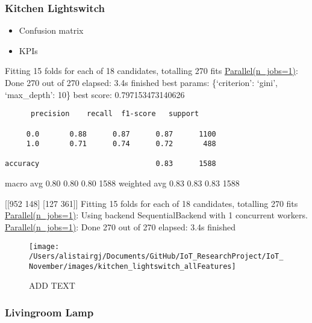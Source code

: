 \documentclass[11pt,]{article}
\providecommand{\tightlist}{%
  \setlength{\itemsep}{0pt}\setlength{\parskip}{0pt}}
\begin{document}
\pagebreak

\hypertarget{kitchen-lightswitch}{%
\subsubsection{Kitchen Lightswitch}\label{kitchen-lightswitch}}

\begin{itemize}
\tightlist
\item
  Confusion matrix
\item
  KPIs
\end{itemize}

Fitting 15 folds for each of 18 candidates, totalling 270 fits
\href{Done\%20270\%20out\%20of\%20270\%20\%7C\%20elapsed:\%202.1s\%20finished}{Parallel(n\_jobs=1)}:
Done 270 out of 270 \textbar{} elapsed: 3.4s finished best params:
\{`criterion': `gini', `max\_depth': 10\} best score: 0.797153473140626

\begin{verbatim}
      precision    recall  f1-score   support

     0.0       0.88      0.87      0.87      1100
     1.0       0.71      0.74      0.72       488

accuracy                           0.83      1588
\end{verbatim}

macro avg 0.80 0.80 0.80 1588 weighted avg 0.83 0.83 0.83 1588

{[}{[}952 148{]} {[}127 361{]}{]} Fitting 15 folds for each of 18
candidates, totalling 270 fits
\href{Done\%20270\%20out\%20of\%20270\%20\%7C\%20elapsed:\%202.1s\%20finished}{Parallel(n\_jobs=1)}:
Using backend SequentialBackend with 1 concurrent workers.
\href{Done\%20270\%20out\%20of\%20270\%20\%7C\%20elapsed:\%202.1s\%20finished}{Parallel(n\_jobs=1)}:
Done 270 out of 270 \textbar{} elapsed: 3.4s finished

\begin{figure}[H]

{\centering \texttt{[image: /Users/alistairgj/Documents/GitHub/IoT\_ResearchProject/IoT\_November/images/kitchen\_lightswitch\_allFeatures]} 

}

\caption{ADD TEXT}\label{fig:unnamed-chunk-13}
\end{figure}

\pagebreak

\hypertarget{livingroom-lamp}{%
\subsubsection{Livingroom Lamp}\label{livingroom-lamp}}
\end{document}
